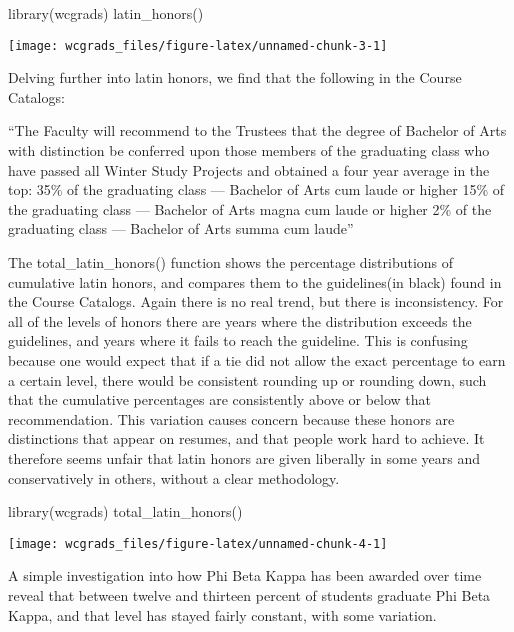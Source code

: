\begin{Schunk}
\begin{Sinput}
library(wcgrads)
latin_honors()
\end{Sinput}

\texttt{[image: wcgrads\_files/figure-latex/unnamed-chunk-3-1]} \end{Schunk}

Delving further into latin honors, we find that the following in the
Course Catalogs:

``The Faculty will recommend to the Trustees that the degree of Bachelor
of Arts with distinction be conferred upon those members of the
graduating class who have passed all Winter Study Projects and obtained
a four year average in the top: 35\% of the graduating class ---
Bachelor of Arts cum laude or higher 15\% of the graduating class ---
Bachelor of Arts magna cum laude or higher 2\% of the graduating class
--- Bachelor of Arts summa cum laude''

The total\_latin\_honors() function shows the percentage distributions
of cumulative latin honors, and compares them to the guidelines(in
black) found in the Course Catalogs. Again there is no real trend, but
there is inconsistency. For all of the levels of honors there are years
where the distribution exceeds the guidelines, and years where it fails
to reach the guideline. This is confusing because one would expect that
if a tie did not allow the exact percentage to earn a certain level,
there would be consistent rounding up or rounding down, such that the
cumulative percentages are consistently above or below that
recommendation. This variation causes concern because these honors are
distinctions that appear on resumes, and that people work hard to
achieve. It therefore seems unfair that latin honors are given liberally
in some years and conservatively in others, without a clear methodology.

\begin{Schunk}
\begin{Sinput}
library(wcgrads)
total_latin_honors()
\end{Sinput}

\texttt{[image: wcgrads\_files/figure-latex/unnamed-chunk-4-1]} \end{Schunk}

A simple investigation into how Phi Beta Kappa has been awarded over
time reveal that between twelve and thirteen percent of students
graduate Phi Beta Kappa, and that level has stayed fairly constant, with
some variation.

